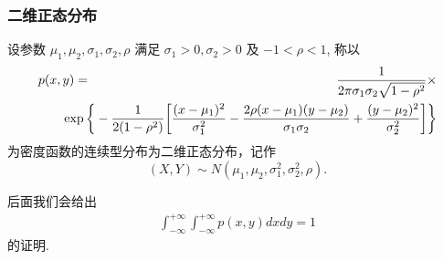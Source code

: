 \documentclass[Prob-All.tex]{subfiles}
\begin{document}
\begin{frame}
	\frametitle{二维正态分布}
	\begin{defi}
		设参数 $\mu_1,\mu_2,\sigma_1,\sigma_2, \rho$ 满足 $\sigma_1>0,\sigma_2>0$ 及 $-1<\rho<1$, 称以
		\begin{eqnarray*}
			p(x,y)&=&\dfrac{1}{2\pi \sigma_1\sigma_2\sqrt{1-\rho^2}}\times\\
			&&\hspace{-1cm}\exp\bigg\{-\dfrac{1}{2(1-\rho^2)}\bigg[\dfrac{(x-\mu_1)^2}{\sigma_1^2}-\dfrac{2\rho(x-\mu_1)(y-\mu_2)}{\sigma_1\sigma_2}+\dfrac{(y-\mu_2)^2}{\sigma_2^2}\bigg]\bigg\}
		\end{eqnarray*}
		为密度函数的连续型分布为二维正态分布，记作 $$(X,Y)\sim N (\mu_1,\mu_2,\sigma_1^2,\sigma_2^2,\rho).$$
	\end{defi}

	\pause 后面我们会给出
	\begin{eqnarray*}
		\int_{-\infty}^{+\infty}  \int_{-\infty}^{+\infty}p(x,y)dxdy=1
	\end{eqnarray*}
	的证明.
\end{frame}
\end{document}
